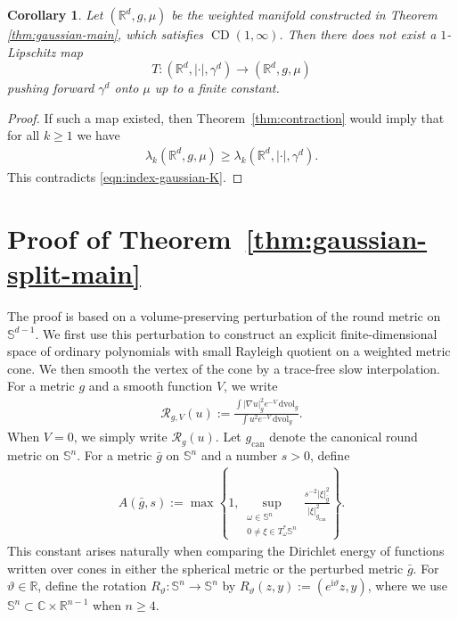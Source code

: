 \documentclass[11pt,reqno]{amsart}
\numberwithin{equation}{section}
\newtheorem{cor}[thm]{Corollary}
\theoremstyle{definition}
\theoremstyle{remark}
\def\cR {\mathcal{R}}
\newcommand{\iii}{\mathrm i}
\newcommand{\R}{\mathbb{R}}
\newcommand{\lam}{\lambda}
\newcommand{\0}{\emptyset}
\newcommand{\bbC}{\mathbb C}
\newcommand{\bbR}{\mathbb R}
\newcommand{\bbS}{\mathbb S}
\newcommand{\can}{\mathrm{can}}
\newcommand{\dvol}{\,\mathrm{dvol}}
\newcommand{\CD}{\operatorname{CD}}
\begin{document}
\begin{cor}\label{cor:gaussian}
Let \((\R^d,g,\mu)\) be the weighted manifold constructed in Theorem
\ref{thm:gaussian-main}, which satisfies \(\CD(1,\infty)\). Then there does not exist a $1$-Lipschitz map
\[
        T:(\R^d,|\cdot|,\gamma^d)\to (\R^d,g,\mu)
\]
pushing forward $\gamma^d$ onto $\mu$ up to a finite constant.
\end{cor}
\begin{proof}
If such a map existed, then Theorem~\ref{thm:contraction} would imply that for all $k\geq 1$ we have
\begin{align}
   \lam_k(\R^d,g,\mu) \geq  \lam_k(\R^d,|\cdot|,\gamma^d).
\end{align}
This contradicts \eqref{eqn:index-gaussian-K}.
\end{proof}

\section{Proof of Theorem~\ref{thm:gaussian-split-main}}
The proof is based on a volume-preserving perturbation of the round metric on
$\bbS^{d-1}$. We first use this perturbation to construct an explicit
finite-dimensional space of ordinary polynomials with small Rayleigh quotient
on a weighted metric cone. We then smooth the vertex of the cone by a
trace-free slow interpolation.  For a metric $g$ and a smooth function $V$, we write
\begin{align}
        \cR_{g,V}(u)
        :=
        \frac{\int |\nabla u|_g^2e^{-V}\dvol_g}
        {\int u^2e^{-V}\dvol_g}.
\end{align}
When $V=0$, we simply write $\cR_g(u)$. Let $g_{\can}$ denote the
canonical round metric on $\bbS^n$. For a metric $\bar{g}$ on $\bbS^n$ and a number
$s>0$, define
\begin{align}\label{eq:gaussian-split-Ahs}
        A(\bar{g},s)
        :=
        \max\left\{
        1,
        \sup_{\substack{\omega\in\bbS^n\\0\neq\xi\in T_\omega^*\bbS^n}}
        \frac{s^{-2}|\xi|_{\bar{g}}^2}{|\xi|_{g_\can}^2}
        \right\}.
\end{align}
This constant arises naturally when comparing the Dirichlet energy of functions written over cones in either the spherical metric or the perturbed metric $\bar{g}.$ For $\vartheta\in\bbR$, define the rotation
$R_\vartheta:\bbS^n\to\bbS^n$ by $R_\vartheta(z,y):=(e^{\iii\vartheta}z,y)$, where we use $\bbS^n\subset \bbC\times \R^{n-1}$ when $n\geq 4.$
\end{document}
